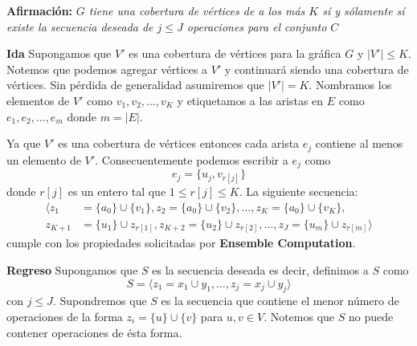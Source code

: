 \documentclass[spanish, xcolor=dvipsnames, aspectratio=169]{beamer}
\newcommand{\subsectiontitle}{}
\begin{document}
\begin{frame}{\subsectiontitle}
    \textbf{Afirmación:}
    \newline
    \textit{\(G\) tiene una cobertura de vértices de a los más \(K\) sí y sólamente sí existe la secuencia deseada de \(j \leq J\) operaciones 
    para el conjunto \(C\)}
\end{frame}
\begin{frame}{\subsectiontitle}
    \textbf{Ida}
    \newline
    Supongamos que \(V'\) es una cobertura de vértices para la gráfica \(G\) y \(|V'| \leq K\). Notemos que podemos agregar vértices a \(V'\) y continuará 
    siendo una cobertura de vértices. Sin pérdida de generalidad asumiremos que \(|V'| = K\). Nombramos los elementos de \(V'\) como 
    \(v_{1}, v_{2}, \dotsc, v_{K}\) y etiquetamos a las aristas en \(E\) como \(e_{1}, e_{2}, \dotsc, e_{m}\) donde \(m = |E|\). 
\end{frame}
\begin{frame}{\subsectiontitle}
    Ya que \(V'\) es una cobertura de vértices 
    entonces cada arista \(e_{j}\) contiene al menos un elemento de \(V'\). Consecuentemente podemos escribir a \(e_{j}\) como 
    \[
        e_{j} = \{u_{j}, v_{r\left[j\right]}\}
    \]
    donde \(r\left[j\right]\) es un entero tal que \(1 \leq r\left[j\right] \leq K\). La siguiente secuencia:
    \begin{align*}
        \langle z_{1} &=\{a_{0}\} \cup \{v_{1}\}, z_{2} = \{a_{0}\} \cup \{v_{2}\}, \dotsc, z_{K} = \{a_{0}\} \cup \{v_{K}\}, \\
                        z_{K + 1} &= \{u_{1}\} \cup z_{r\left[1\right]}, z_{K + 2} = \{u_{2}\} \cup z_{r\left[2\right]}, \dotsc, z_{J} = \{u_{m}\} \cup z_{r\left[m\right]} \rangle  
    \end{align*}
    cumple con los propiedades solicitadas por \textbf{Ensemble Computation}.
\end{frame}
\begin{frame}{\subsectiontitle}
    \textbf{Regreso}
    \newline
    Supongamos que \(S\) es la secuencia deseada es decir, definimos a \(S\) como 
    \[
        S = \langle z_{1} = x_{1} \cup y_{1}, \dotsc, z_{j} = x_{j} \cup y_{j}  \rangle  
    \]
    con \(j \leq J\). Supondremos que \(S\) es la secuencia que contiene el menor número de operaciones de la forma \(z_{i} = \{ u \} \cup \{ v \}\)
    para \(u, v \in V\). Notemos que \(S\) no puede contener operaciones de ésta forma.
\end{frame}
\end{document}
